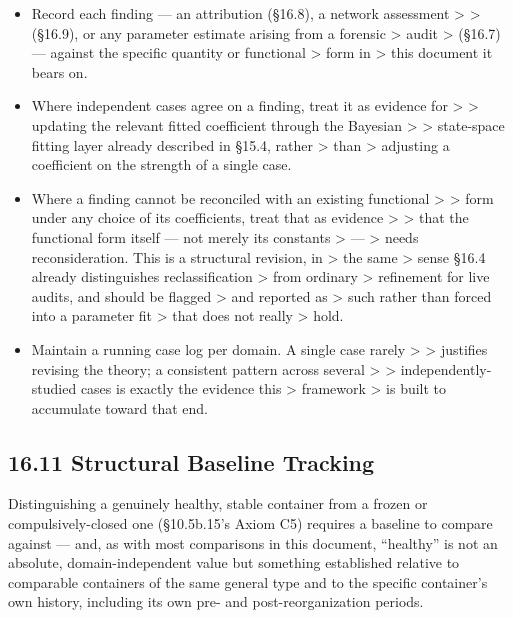 \documentclass[
]{article}
\begin{document}
\begin{itemize}
\item
  Record each finding --- an attribution (§16.8), a network assessment
  \textgreater{} \textgreater{} (§16.9), or any parameter estimate
  arising from a forensic \textgreater{} audit \textgreater{} (§16.7)
  --- against the specific quantity or functional \textgreater{} form in
  \textgreater{} this document it bears on.
\item
  Where independent cases agree on a finding, treat it as evidence for
  \textgreater{} \textgreater{} updating the relevant fitted coefficient
  through the Bayesian \textgreater{} \textgreater{} state-space fitting
  layer already described in §15.4, rather \textgreater{} than
  \textgreater{} adjusting a coefficient on the strength of a single
  case.
\item
  Where a finding cannot be reconciled with an existing functional
  \textgreater{} \textgreater{} form under any choice of its
  coefficients, treat that as evidence \textgreater{} \textgreater{}
  that the functional form itself --- not merely its constants
  \textgreater{} --- \textgreater{} needs reconsideration. This is a
  structural revision, in \textgreater{} the same \textgreater{} sense
  §16.4 already distinguishes reclassification \textgreater{} from
  ordinary \textgreater{} refinement for live audits, and should be
  flagged \textgreater{} and reported as \textgreater{} such rather than
  forced into a parameter fit \textgreater{} that does not really
  \textgreater{} hold.
\item
  Maintain a running case log per domain. A single case rarely
  \textgreater{} \textgreater{} justifies revising the theory; a
  consistent pattern across several \textgreater{} \textgreater{}
  independently-studied cases is exactly the evidence this
  \textgreater{} framework \textgreater{} is built to accumulate toward
  that end.
\end{itemize}

\hypertarget{structural-baseline-tracking}{%
\subsection{16.11 Structural Baseline
Tracking}\label{structural-baseline-tracking}}

Distinguishing a genuinely healthy, stable container from a frozen or
compulsively-closed one (§10.5b.15's Axiom C5) requires a baseline to
compare against --- and, as with most comparisons in this document,
``healthy'' is not an absolute, domain-independent value but something
established relative to comparable containers of the same general type
and to the specific container's own history, including its own pre- and
post-reorganization periods.
\end{document}
